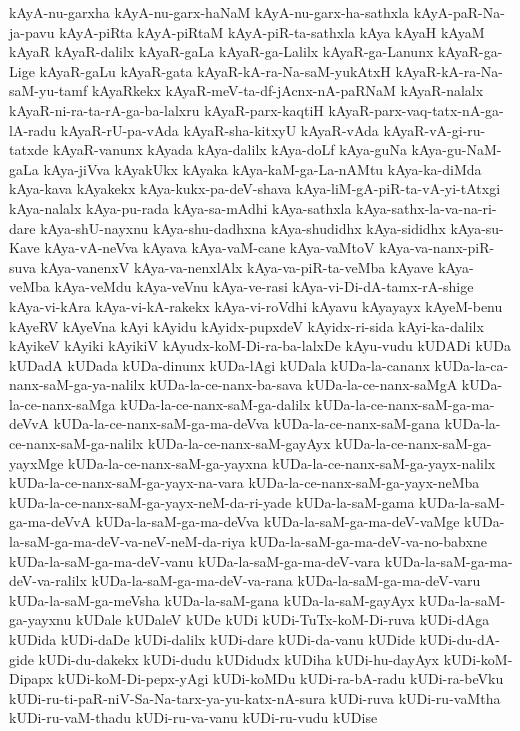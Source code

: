 {kAyA-nu-garxha
kAyA-nu-garx-haNaM
kAyA-nu-garx-ha-sathxla
kAyA-paR-Na-ja-pavu
kAyA-piRta
kAyA-piRtaM
kAyA-piR-ta-sathxla
kAya
kAyaH
kAyaM
kAyaR
kAyaR-dalilx
kAyaR-gaLa
kAyaR-ga-Lalilx
kAyaR-ga-Lanunx
kAyaR-ga-Lige
kAyaR-gaLu
kAyaR-gata
kAyaR-kA-ra-Na-saM-yukAtxH
kAyaR-kA-ra-Na-saM-yu-tamf
kAyaRkekx
kAyaR-meV-ta-df-jAcnx-nA-paRNaM
kAyaR-nalalx
kAyaR-ni-ra-ta-rA-ga-ba-lalxru
kAyaR-parx-kaqtiH
kAyaR-parx-vaq-tatx-nA-ga-lA-radu
kAyaR-rU-pa-vAda
kAyaR-sha-kitxyU
kAyaR-vAda
kAyaR-vA-gi-ru-tatxde
kAyaR-vanunx
kAyada
kAya-dalilx
kAya-doLf
kAya-guNa
kAya-gu-NaM-gaLa
kAya-jiVva
kAyakUkx
kAyaka
kAya-kaM-ga-La-nAMtu
kAya-ka-diMda
kAya-kava
kAyakekx
kAya-kukx-pa-deV-shava
kAya-liM-gA-piR-ta-vA-yi-tAtxgi
kAya-nalalx
kAya-pu-rada
kAya-sa-mAdhi
kAya-sathxla
kAya-sathx-la-va-na-ri-dare
kAya-shU-nayxnu
kAya-shu-dadhxna
kAya-shudidhx
kAya-sididhx
kAya-su-Kave
kAya-vA-neVva
kAyava
kAya-vaM-cane
kAya-vaMtoV
kAya-va-nanx-piR-suva
kAya-vanenxV
kAya-va-nenxlAlx
kAya-va-piR-ta-veMba
kAyave
kAya-veMba
kAya-veMdu
kAya-veVnu
kAya-ve-rasi
kAya-vi-Di-dA-tamx-rA-shige
kAya-vi-kAra
kAya-vi-kA-rakekx
kAya-vi-roVdhi
kAyavu
kAyayayx
kAyeM-benu
kAyeRV
kAyeVna
kAyi
kAyidu
kAyidx-pupxdeV
kAyidx-ri-sida
kAyi-ka-dalilx
kAyikeV
kAyiki
kAyikiV
kAyudx-koM-Di-ra-ba-lalxDe
kAyu-vudu
kUDADi
kUDa
kUDadA
kUDada
kUDa-dinunx
kUDa-lAgi
kUDala
kUDa-la-cananx
kUDa-la-ca-nanx-saM-ga-ya-nalilx
kUDa-la-ce-nanx-ba-sava
kUDa-la-ce-nanx-saMgA
kUDa-la-ce-nanx-saMga
kUDa-la-ce-nanx-saM-ga-dalilx
kUDa-la-ce-nanx-saM-ga-ma-deVvA
kUDa-la-ce-nanx-saM-ga-ma-deVva
kUDa-la-ce-nanx-saM-gana
kUDa-la-ce-nanx-saM-ga-nalilx
kUDa-la-ce-nanx-saM-gayAyx
kUDa-la-ce-nanx-saM-ga-yayxMge
kUDa-la-ce-nanx-saM-ga-yayxna
kUDa-la-ce-nanx-saM-ga-yayx-nalilx
kUDa-la-ce-nanx-saM-ga-yayx-na-vara
kUDa-la-ce-nanx-saM-ga-yayx-neMba
kUDa-la-ce-nanx-saM-ga-yayx-neM-da-ri-yade
kUDa-la-saM-gama
kUDa-la-saM-ga-ma-deVvA
kUDa-la-saM-ga-ma-deVva
kUDa-la-saM-ga-ma-deV-vaMge
kUDa-la-saM-ga-ma-deV-va-neV-neM-da-riya
kUDa-la-saM-ga-ma-deV-va-no-babxne
kUDa-la-saM-ga-ma-deV-vanu
kUDa-la-saM-ga-ma-deV-vara
kUDa-la-saM-ga-ma-deV-va-ralilx
kUDa-la-saM-ga-ma-deV-va-rana
kUDa-la-saM-ga-ma-deV-varu
kUDa-la-saM-ga-meVsha
kUDa-la-saM-gana
kUDa-la-saM-gayAyx
kUDa-la-saM-ga-yayxnu
kUDale
kUDaleV
kUDe
kUDi
kUDi-TuTx-koM-Di-ruva
kUDi-dAga
kUDida
kUDi-daDe
kUDi-dalilx
kUDi-dare
kUDi-da-vanu
kUDide
kUDi-du-dA-gide
kUDi-du-dakekx
kUDi-dudu
kUDidudx
kUDiha
kUDi-hu-dayAyx
kUDi-koM-Dipapx
kUDi-koM-Di-pepx-yAgi
kUDi-koMDu
kUDi-ra-bA-radu
kUDi-ra-beVku
kUDi-ru-ti-paR-niV-Sa-Na-tarx-ya-yu-katx-nA-sura
kUDi-ruva
kUDi-ru-vaMtha
kUDi-ru-vaM-thadu
kUDi-ru-va-vanu
kUDi-ru-vudu
kUDise
}
